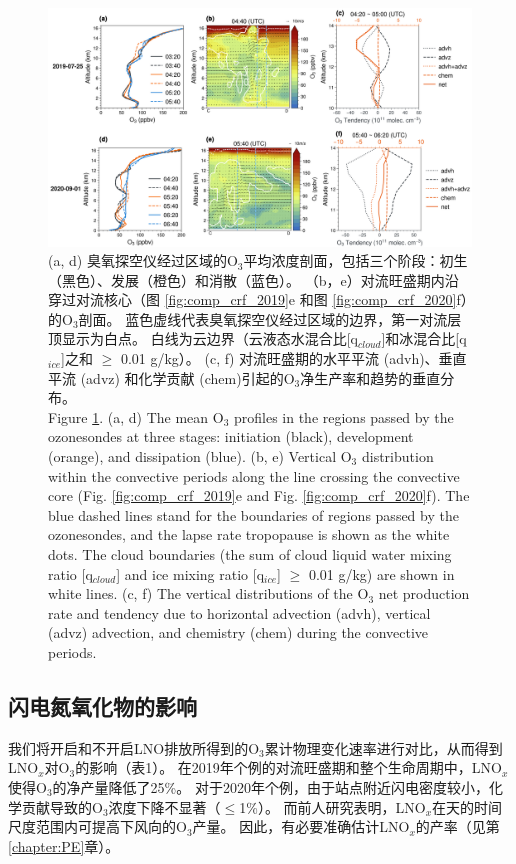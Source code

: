 \begin{figure}[htbp]
\centering
\includegraphics[width=\textwidth]{./figures/tendency_o3.png}
\caption{
(a, d) 臭氧探空仪经过区域的O$_3$平均浓度剖面，包括三个阶段：初生（黑色）、发展（橙色）和消散（蓝色）。
（b，e）对流旺盛期内沿穿过对流核心（图 \ref{fig:comp_crf_2019}e 和图 \ref{fig:comp_crf_2020}f）的O$_3$剖面。
蓝色虚线代表臭氧探空仪经过区域的边界，第一对流层顶显示为白点。
白线为云边界（云液态水混合比[q$_{cloud}$]和冰混合比[q$_{ice}$]之和 $\geq$ 0.01 g/kg）。
(c, f) 对流旺盛期的水平平流 (advh)、垂直平流 (advz) 和化学贡献 (chem)引起的O$_3$净生产率和趋势的垂直分布。
\\
Figure \ref{fig:tendency_o3}. (a, d) The mean O$_3$ profiles in the regions passed by the ozonesondes
at three stages: initiation (black), development (orange), and dissipation (blue).
(b, e) Vertical O$_3$ distribution within the convective periods along the line crossing the convective core (Fig. \ref{fig:comp_crf_2019}e and Fig. \ref{fig:comp_crf_2020}f).
The blue dashed lines stand for the boundaries of regions passed by the ozonesondes, and the lapse rate tropopause is shown as the white dots.
The cloud boundaries (the sum of cloud liquid water mixing ratio [q$_{cloud}$] and ice mixing ratio [q$_{ice}$] $\geq$ 0.01 g/kg) are shown in white lines.
(c, f) The vertical distributions of the O$_3$ net production rate and tendency due to horizontal advection (advh), vertical (advz) advection, and chemistry (chem) during the convective periods.
}
\label{fig:tendency_o3}
\end{figure}


\subsection{闪电氮氧化物的影响}

我们将开启和不开启LNO排放所得到的O$_3$累计物理变化速率进行对比，从而得到LNO$_x$对O$_3$的影响（表1）。
在2019年个例的对流旺盛期和整个生命周期中，LNO$_x$使得O$_3$的净产量降低了25\%。
对于2020年个例，由于站点附近闪电密度较小，化学贡献导致的O$_3$浓度下降不显著（$\leq$1\%）。
而前人研究表明，LNO$_x$在天的时间尺度范围内可提高下风向的O$_3$产量\citep{Pickering.1996,DeCaria.2005}。
因此，有必要准确估计LNO$_x$的产率（见第\ref{chapter:PE}章）。

